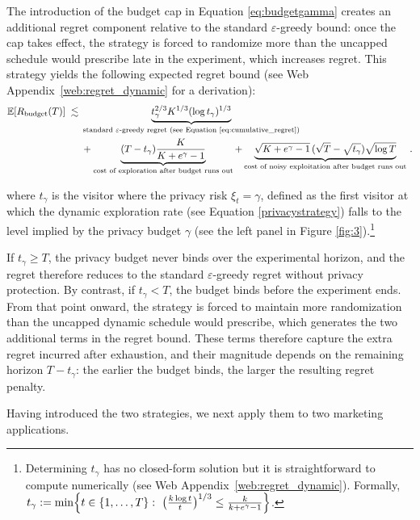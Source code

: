 \documentclass[mksc,nonblindrev]{informs3}
\begin{document}
The introduction of the budget cap in Equation \eqref{eq:budgetgamma} creates an additional regret component relative to the standard $\varepsilon$-greedy bound: once the cap takes effect, the strategy is forced to randomize more than the uncapped schedule would prescribe late in the experiment, which increases regret. This strategy yields the following expected regret bound (see Web Appendix~\ref{web:regret_dynamic} for a derivation):
\begin{equation}\label{eq:regret_dynamic}
\begin{aligned}
\mathbb{E}[R_{\text{budget}}(T)]
\;\lesssim\;&
\underbrace{t_\gamma^{2/3} K^{1/3} (\log t_\gamma)^{1/3}}_{\text{standard $\varepsilon$-greedy regret (see Equation \ref{eq:cumulative_regret})}}
\\
&+
\underbrace{(T - t_\gamma)\frac{K}{K + e^{\gamma} - 1}}_{\text{cost of exploration after budget runs out}}
+
\underbrace{\sqrt{K + e^{\gamma} - 1}\,(\sqrt{T} - \sqrt{t_\gamma})\sqrt{\log T}}_{\text{cost of noisy exploitation after budget runs out}} \, .
\end{aligned}
\end{equation}

where $t_\gamma$ is the visitor where the privacy risk $\xi_t = \gamma$, defined as the first visitor at which the dynamic exploration rate (see Equation \ref{privacystrategy}) falls to the level implied by the privacy budget $\gamma$ (see the left panel in Figure \ref{fig:3}).\footnote{Determining $t_\gamma$ has no closed-form solution but it is straightforward to compute numerically (see Web Appendix~\ref{web:regret_dynamic}). Formally, $t_\gamma := \min\Bigl\{t\in\{1,\dots,T\}:\ \bigl(\tfrac{k\log t}{t}\bigr)^{1/3}\le \tfrac{k}{k+e^\gamma-1}\Bigr\}$.} 

If \(t_\gamma \geq T\), the privacy budget never binds over the experimental horizon, and the regret therefore reduces to the standard \(\varepsilon\)-greedy regret without privacy protection. By contrast, if \(t_\gamma < T\), the budget binds before the experiment ends. From that point onward, the strategy is forced to maintain more randomization than the uncapped dynamic schedule would prescribe, which generates the two additional terms in the regret bound. These terms therefore capture the extra regret incurred after exhaustion, and their magnitude depends on the remaining horizon \(T - t_\gamma\): the earlier the budget binds, the larger the resulting regret penalty.

Having introduced the two strategies, we next apply them to two marketing applications.
\end{document}
